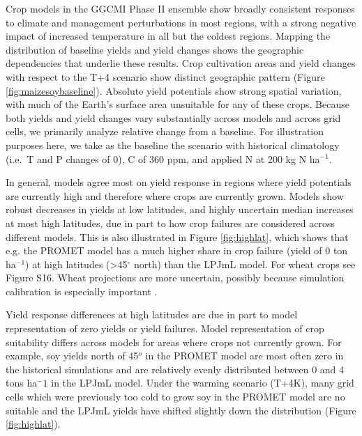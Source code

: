 \documentclass[gmd, manuscript]{copernicus} %
\begin{document}
Crop models in the GGCMI Phase II ensemble show broadly consistent responses to climate and management perturbations in most regions, with a strong negative impact of increased temperature in all but the coldest regions. 
Mapping the distribution of baseline yields and yield changes shows the geographic dependencies that underlie these results. 
Crop cultivation areas and yield changes with respect to the T+4 scenario show distinct geographic pattern (Figure \ref{fig:maizesoybaseline}).
Absolute yield potentials show strong spatial variation, with much of the Earth's surface area unsuitable for any of these crops.
Because both yields and yield changes vary substantially across models and across grid cells, we primarily analyze relative change from a baseline. 
For illustration purposes here, we take as the baseline the scenario with historical climatology (i.e.\ T and P changes of 0), C of 360 ppm, and applied N at 200 kg N ha$^{-1}$. 

In general, models agree most on yield response in regions where yield potentials are currently high and therefore where crops are currently grown. 
Models show robust decreases in yields at low latitudes, and highly uncertain median increases at most high latitudes, due in part to how crop failures are considered across different models. 
This is also illustrated in Figure \ref{fig:highlat}, which shows that e.g. the PROMET model has a much higher share in crop failure (yield of 0 ton ha$^{-1}$) at high latitudes (>45$^\circ$ north) than the LPJmL model.
For wheat crops see Figure S16.
Wheat projections are more uncertain, possibly because simulation calibration is especially important \citep[e.g.][]{Asseng2013}.

Yield response differences at high latitudes are due in part to model representation of zero yields or yield failures. Model representation of crop suitability differs across models for areas where crops not currently grown. For example, soy yields north of 45$^o$ in the PROMET model are most often zero in the historical simulations and are relatively evenly distributed between 0 and 4 tons ha$^-1$ in the LPJmL model. Under the warming scenario (T+4K), many grid cells which were previously too cold to grow soy in the PROMET model are no suitable and the LPJmL yields have shifted slightly down the distribution (Figure \ref{fig:highlat}).
\end{document}
